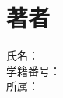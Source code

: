 \documentclass[10pt, a4paper, uplatex]{jsarticle}
\begin{document}
\newcommand{\eq}[1]{(式\ref{#1}) }
\newcommand{\fig}[1]{図\ref{#1} }
\newcommand{\tbl}[1]{表\ref{#1} }
\renewcommand{\figurename}{図}
\renewcommand{\tablename}{表}
\renewcommand{\refname}{参考文献}
\renewcommand{\bibname}{参考文献}
\renewcommand{\theequation}{\arabic{equation}}                          %

\maketitle
\section*{著者}
\begin{description}
    \item[氏名：]
    \item[学籍番号：] 
    \item[所属：]
\end{description}

\section{}


\subsection{}


% 
% 



% 
\end{document}
